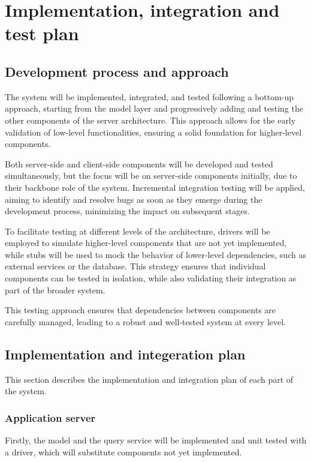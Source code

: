 \chapter{Implementation, integration and test plan}

\section{Development process and approach}

The system will be implemented, integrated, and tested following a bottom-up approach, starting from the model layer and progressively adding and testing the other components of the server architecture.
This approach allows for the early validation of low-level functionalities, ensuring a solid foundation for higher-level components.

Both server-side and client-side components will be developed and tested simultaneously, but the focus will be on server-side components initially, due to their backbone role of the system.
Incremental integration testing will be applied, aiming to identify and resolve bugs as soon as they emerge during the development process, minimizing the impact on subsequent stages.

To facilitate testing at different levels of the architecture, drivers will be employed to simulate higher-level components that are not yet implemented, while stubs will be used to mock the behavior of lower-level dependencies, such as external services or the database.
This strategy ensures that individual components can be tested in isolation, while also validating their integration as part of the broader system.

This testing approach ensures that dependencies between components are carefully managed, leading to a robust and well-tested system at every level.

\section{Implementation and integeration plan}

This section describes the implementation and integration plan of each part of the system.

\subsection{Application server}

Firstly, the model and the query service will be implemented and unit tested with a driver, which will substitute components not yet implemented.

